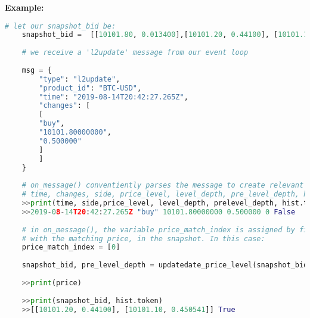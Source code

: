 \textbf{Example:}
\begin{lstlisting}[language=Python]
	# let our snapshot_bid be:
	snapshot_bid =  [[10101.80, 0.013400],[10101.20, 0.44100], [10101.10, 0.450541]]
	
	# we receive a 'l2update' message from our event loop
	
	msg = {
		"type": "l2update",
		"product_id": "BTC-USD",
		"time": "2019-08-14T20:42:27.265Z",
		"changes": [
		[
		"buy",
		"10101.80000000",
		"0.500000"
		]
		]
	}
	
	# on_message() conventiently parses the message to create relevant local variables
	# time, changes, side, price_level, level_depth, pre_level_depth, hist.token
	>>print(time, side,price_level, level_depth, prelevel_depth, hist.token)
	>>2019-08-14T20:42:27.265Z "buy" 10101.80000000 0.500000 0 False
	
	# in on_message(), the variable price_match_index is assigned by finding the index
	# with the matching price, in the snapshot. In this case:
	price_match_index = [0] 
	
	snapshot_bid, pre_level_depth = updatedate_price_level(snapshot_bid, level_depth, price_match_index, pre_level_depth)
	
	>>print(price)
	
	>>print(snapshot_bid, hist.token)
	>>[[10101.20, 0.44100], [10101.10, 0.450541]] True
\end{lstlisting}